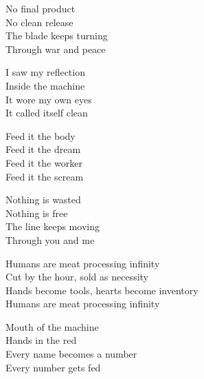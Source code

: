 \begin{lyrics}
No final product\\
No clean release\\
The blade keeps turning\\
Through war and peace

I saw my reflection\\
Inside the machine\\
It wore my own eyes\\
It called itself clean

Feed it the body\\
Feed it the dream\\
Feed it the worker\\
Feed it the scream

Nothing is wasted\\
Nothing is free\\
The line keeps moving\\
Through you and me

Humans are meat processing infinity\\
Cut by the hour, sold as necessity\\
Hands become tools, hearts become inventory\\
Humans are meat processing infinity

Mouth of the machine\\
Hands in the red\\
Every name becomes a number\\
Every number gets fed
\end{lyrics}

